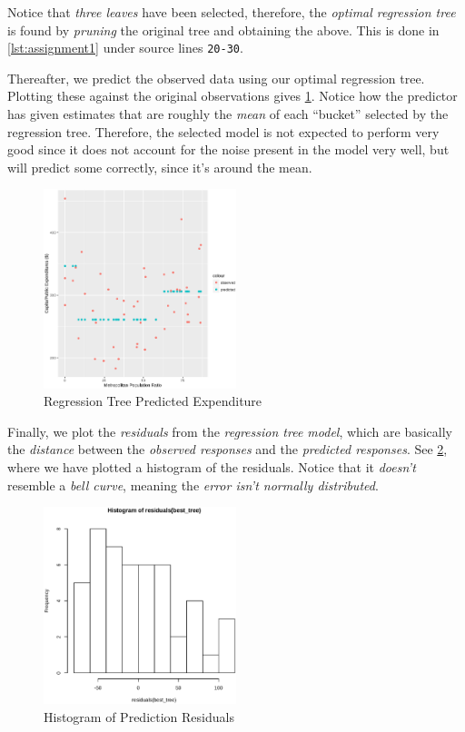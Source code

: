 \documentclass[a4paper, twocolumn]{article}
\begin{document}
        Notice that \emph{three leaves} have been selected, therefore, the \emph{optimal regression tree} is found by \emph{pruning} the original tree and obtaining the above. This is done in \cref{lst:assignment1} under source lines \verb|20-30|.

        Thereafter, we predict the observed data using our optimal regression tree. Plotting these against the original observations gives \cref{fig:predicted_state}. Notice how the predictor has given estimates that are roughly the \emph{mean} of each ``bucket'' selected by the regression tree. Therefore, the selected model is not expected to perform very good since it does not account for the noise present in the model very well, but will predict some correctly, since it's around the mean.

        \begin{figure}[h!]
            \centering
            \caption{Regression Tree Predicted Expenditure}
            \label{fig:predicted_state}
            \includegraphics[width=0.5\textwidth]{share/predicted_state.eps}
        \end{figure}

        Finally, we plot the \emph{residuals} from the \emph{regression tree model}, which are basically the \emph{distance} between the \emph{observed responses} and the \emph{predicted responses}. See \cref{fig:histogram}, where we have plotted a histogram of the residuals. Notice that it \emph{doesn't} resemble a \emph{bell curve}, meaning the \emph{error isn't normally distributed}.

        \begin{figure}[h!]
            \centering
            \caption{Histogram of Prediction Residuals}
            \label{fig:histogram}
            \includegraphics[width=0.5\textwidth]{share/histogram.eps}
        \end{figure}
\end{document}
